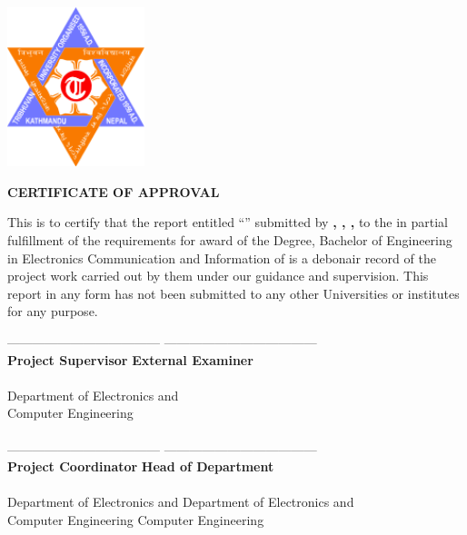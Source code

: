 \begin{titlepage}
	\clearpage
	\vfill
		\begin{center}
			\textbf{\MakeUppercase{\cUniversity}}\\
			\textbf{\MakeUppercase{\cDepartment} }\\
			\textbf{\MakeUppercase{\cCampus}} \\
			\vspace{4mm}		
			\includegraphics[width=4cm]{images/logo.png}		
		
			\vspace{4mm}		
			\textbf{ \Large \uppercase{certificate of approval} }
			\vspace{4mm}		
	
		\end{center}
			\noindent This is to certify that the report entitled “\textbf{\cTitle}” submitted by \textbf{\MakeUppercase{\cSubmittedI, \cSubmittedII,  \cSubmittedIII, \cSubmittedIV }} to the \cUniversity in partial fulfillment of the requirements for  award of the Degree, Bachelor of Engineering in Electronics Communication and Information of is a debonair record of the project work carried out by them under our guidance and supervision. This report in any form has not been submitted to any other Universities or institutes for any purpose.	
		
		\vspace{10mm}
		\noindent------------------------------------ \hfill ------------------------------------\\
		\noindent \textbf{Project Supervisor} \hfill \textbf{External Examiner}\\
		\noindent \cSupervisor \hfill \cExternalExaminer\\
		\noindent Department of Electronics and \\ Computer Engineering \\
		\noindent \cCampus \\
	
		\vspace{1cm}
		\noindent------------------------------------ \hfill ------------------------------------\\
		\noindent \textbf{Project Coordinator} \hfill \textbf{Head of Department}\\
		\noindent \cProjectCoordinator \hfill \cHOD\\
		\noindent Department of Electronics and \hfill Department of Electronics and \\ \noindent Computer Engineering \hfill Computer Engineering \\
		\noindent \cCampus \hfill \cCampus
	\end{titlepage}

